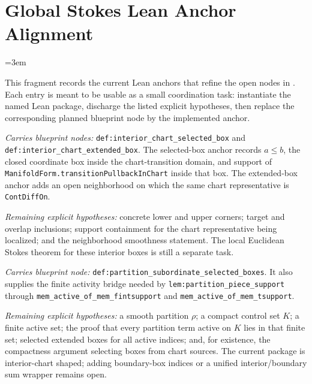 \section{Global Stokes Lean Anchor Alignment}
\label{sec:global_stokes_lean_anchor_alignment}
\begingroup
\sloppy
\emergencystretch=3em

This fragment records the current Lean anchors that refine the open nodes in
.  Each entry is meant to be usable as a small
coordination task: instantiate the named Lean package, discharge the listed
explicit hypotheses, then replace the corresponding planned blueprint node by
the implemented anchor.

\begin{definition}
  \label{anc:interior_chart_box_anchors}
  \leanok
  \emph{Carries blueprint nodes:}
  \texttt{def:interior\_chart\_selected\_box} and
  \texttt{def:interior\_chart\_extended\_box}.
  The selected-box anchor records \(a \le b\), the closed coordinate box inside
  the chart-transition domain, and support of
  \texttt{ManifoldForm.transitionPullbackInChart} inside that box.  The
  extended-box anchor adds an open neighborhood on which the same chart
  representative is \texttt{ContDiffOn}.

  \emph{Remaining explicit hypotheses:}
  concrete lower and upper corners; target and overlap inclusions; support
  containment for the chart representative being localized; and the
  neighborhood smoothness statement.  The local Euclidean Stokes theorem for
  these interior boxes is still a separate task.
\end{definition}

\begin{definition}
  \label{anc:selected_box_partition_of_unity}
  \leanok
  \emph{Carries blueprint node:}
  \texttt{def:partition\_subordinate\_selected\_boxes}.  It also supplies the
  finite activity bridge needed by \texttt{lem:partition\_piece\_support}
  through \texttt{mem\_active\_of\_mem\_fintsupport} and
  \texttt{mem\_active\_of\_mem\_tsupport}.

  \emph{Remaining explicit hypotheses:}
  a smooth partition \(\rho\); a compact control set \(K\); a finite active set;
  the proof that every partition term active on \(K\) lies in that finite set;
  selected extended boxes for all active indices; and, for existence, the
  compactness argument selecting boxes from chart sources.  The current package
  is interior-chart shaped; adding boundary-box indices or a unified
  interior/boundary sum wrapper remains open.
\end{definition}


